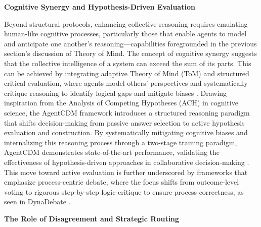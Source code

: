 \documentclass[11pt]{article}
\begin{document}
\textbf{Cognitive Synergy and Hypothesis-Driven Evaluation}

Beyond structural protocols, enhancing collective reasoning requires emulating human-like cognitive processes, particularly those that enable agents to model and anticipate one another's reasoning---capabilities foregrounded in the previous section's discussion of Theory of Mind. The concept of cognitive synergy suggests that the collective intelligence of a system can exceed the sum of its parts. This can be achieved by integrating adaptive Theory of Mind (ToM) and structured critical evaluation, where agents model others' perspectives and systematically critique reasoning to identify logical gaps and mitigate biases \cite{ref25}. Drawing inspiration from the Analysis of Competing Hypotheses (ACH) in cognitive science, the AgentCDM framework introduces a structured reasoning paradigm that shifts decision-making from passive answer selection to active hypothesis evaluation and construction. By systematically mitigating cognitive biases and internalizing this reasoning process through a two-stage training paradigm, AgentCDM demonstrates state-of-the-art performance, validating the effectiveness of hypothesis-driven approaches in collaborative decision-making \cite{ref38}. This move toward active evaluation is further underscored by frameworks that emphasize process-centric debate, where the focus shifts from outcome-level voting to rigorous step-by-step logic critique to ensure process correctness, as seen in DynaDebate \cite{ref205}.

\textbf{The Role of Disagreement and Strategic Routing}
\end{document}
